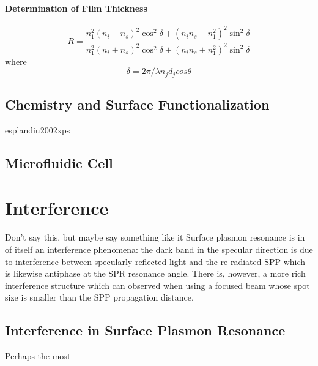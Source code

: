 \documentclass[a4paper,titlepage,onecolumn]{report}
\begin{document}
\subsubsection{Determination of Film Thickness}
\begin{equation}
 R = \frac{n_1^2(n_i-n_s)^2 \cos^2\delta + (n_i n_s - n_1^2)^2\sin^2\delta}
          {n_1^2(n_i+n_s)^2 \cos^2\delta + (n_i n_s + n_1^2)^2\sin^2\delta}
\end{equation}
where
\begin{equation}
\delta = 2\pi/\lambda n_j d_j cos \theta
\end{equation}


\section{Chemistry and Surface Functionalization}
esplandiu2002xps

\section{Microfluidic Cell}

\chapter{Interference}
\label{ch:interference}
Don't say this, but maybe say something like it
Surface plasmon resonance is in of itself an interference phenomena: the dark band in the specular direction is due to interference between
specularly reflected light and the re-radiated SPP which is likewise
antiphase at the SPR resonance angle.  There is, however, a more rich 
interference structure which can observed when using a focused beam whose spot size is smaller than the SPP propagation distance.  

\section{Interference in Surface Plasmon Resonance}
Perhaps the most 
\end{document}
